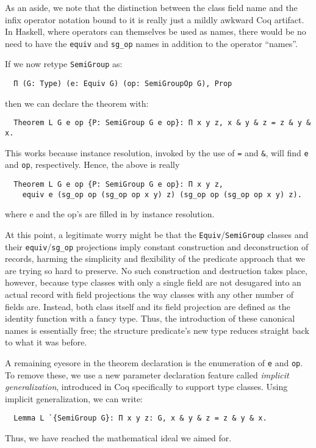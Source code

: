 \documentclass[a4paper,10pt,runningheads]{llncs}
\begin{document}
As an aside, we note that the distinction between the class field name and the infix operator notation bound to it is really just a mildly awkward Coq artifact. In Haskell, where operators can themselves be used as names, there would be no need to have the \lstinline|equiv| and \lstinline|sg_op| names in addition to the operator ``names''.

If we now retype \lstinline|SemiGroup| as:
\begin{lstlisting}
  Π (G: Type) (e: Equiv G) (op: SemiGroupOp G), Prop
\end{lstlisting}
then we can declare the theorem with:
\begin{lstlisting}
  Theorem L G e op {P: SemiGroup G e op}: Π x y z, x & y & z = z & y & x.
\end{lstlisting}
This works because instance resolution, invoked by the use of \lstinline|=| and \lstinline|&|, will find \lstinline|e| and \lstinline|op|, respectively. Hence, the above is really

\begin{lstlisting}
  Theorem L G e op {P: SemiGroup G e op}: Π x y z,
    equiv e (sg_op op (sg_op op x y) z) (sg_op op (sg_op op x y) z).
\end{lstlisting}
where e and the op's are filled in by instance resolution.

At this point, a legitimate worry might be that the \lstinline|Equiv|/\lstinline|SemiGroup| classes and their \lstinline|equiv|/\lstinline|sg_op| projections imply constant construction and deconstruction of records, harming the simplicity and flexibility of the predicate approach that we are trying so hard to preserve. No such construction and destruction takes place, however, because type classes with only a single field are not desugared into an actual record with field projections the way classes with any other number of fields are. Instead, both class itself and its field projection are defined as the identity function with a fancy type. Thus, the introduction of these canonical names is essentially free; the structure predicate's new type reduces straight back to what it was before.

A remaining eyesore in the theorem declaration is the enumeration of \lstinline|e| and \lstinline|op|. To remove these, we use a new parameter declaration feature called \emph{implicit generalization}, introduced in Coq specifically to support type classes. Using implicit generalization, we can write:

\begin{lstlisting}
  Lemma L `{SemiGroup G}: Π x y z: G, x & y & z = z & y & x.
\end{lstlisting}
Thus, we have reached the mathematical ideal we aimed for.
\end{document}
